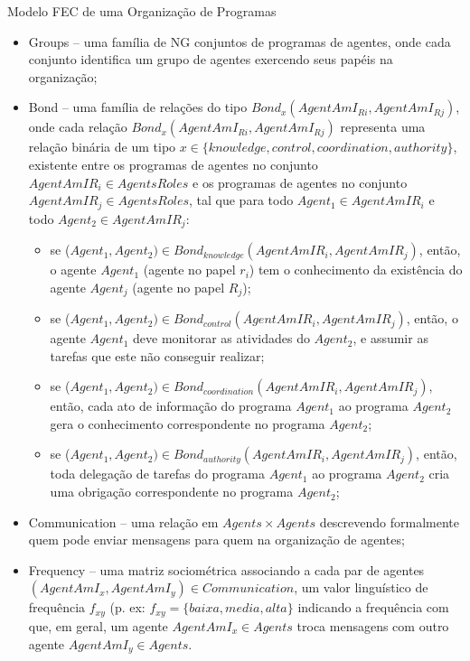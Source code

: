 \begin{section}{Modelo FEC de uma Organização de Programas}
\begin{itemize}
        \item Groups -- uma família de NG conjuntos de programas de agentes, onde cada conjunto identifica um grupo de agentes exercendo seus papéis na organização;
        
        \item Bond -- uma família de relações do tipo $Bond_x(AgentAmI_{Ri}, AgentAmI_{Rj})$, onde cada relação $Bond_x(AgentAmI_{Ri}, AgentAmI_{Rj})$ representa uma relação binária de um tipo $x \in \{knowledge, control, coordination, authority\}$, existente entre os programas de agentes no conjunto $AgentAmIR_{i} \in AgentsRoles$ e os programas de agentes no conjunto $AgentAmIR_{j} \in AgentsRoles$, tal que para todo $Agent_1 \in AgentAmIR_{i}$ e todo $Agent_2 \in AgentAmIR_{j}$:
          
            \begin{itemize}
                \item se ($Agent_1, Agent_2) \in Bond_{knowledge}(AgentAmIR_{i}, AgentAmIR_{j})$, então, o agente $Agent_1$ (agente no papel $r_i$) tem o conhecimento da existência do agente $Agent_j$ (agente no papel $R_j$);
                
                \item se ($Agent_1, Agent_2) \in Bond_{control}(AgentAmIR_{i}, AgentAmIR_{j})$, então, o agente $Agent_1$ deve monitorar as atividades do $Agent_2$, e assumir as tarefas que este não conseguir realizar;
                
                \item se ($Agent_1, Agent_2) \in Bond_{coordination}(AgentAmIR_{i}, AgentAmIR_{j})$, então, cada ato de informação do programa $Agent_1$ ao programa $Agent_2$ gera o conhecimento correspondente no programa $Agent_2$;
                
                \item se ($Agent_1, Agent_2) \in Bond_{authority}(AgentAmIR_{i}, AgentAmIR_{j})$, então, toda delegação de tarefas do programa $Agent_1$ ao programa $Agent_2$ cria uma obrigação correspondente no programa $Agent_2$;
                
            \end{itemize}
        
        
        \item Communication -- uma relação em $Agents \times Agents$ descrevendo formalmente quem pode enviar mensagens para quem na organização de agentes;
        
        \item Frequency -- uma matriz sociométrica associando a cada par de agentes $(AgentAmI_x, AgentAmI_y) \in  Communication$, um valor linguístico de frequência $f_{xy}$ (p. ex: $f_{xy} = \{baixa, media, alta\}$ indicando a frequência com que, em geral, um agente $AgentAmI_x \in Agents$ troca mensagens com outro agente $AgentAmI_y \in Agents$.


\end{itemize}
\end{section}
